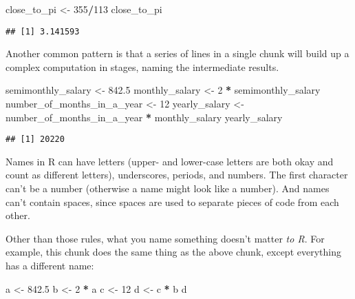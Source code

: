 \documentclass[
]{article}
\newenvironment{Shaded}{\begin{snugshade}}{\end{snugshade}}
\newcommand{\DecValTok}[1]{\textcolor[rgb]{0.00,0.00,0.81}{#1}}
\newcommand{\FloatTok}[1]{\textcolor[rgb]{0.00,0.00,0.81}{#1}}
\newcommand{\NormalTok}[1]{#1}
\newcommand{\OtherTok}[1]{\textcolor[rgb]{0.56,0.35,0.01}{#1}}
\newcommand{\SpecialCharTok}[1]{\textcolor[rgb]{0.81,0.36,0.00}{\textbf{#1}}}
\begin{document}
\begin{Shaded}
\begin{Highlighting}[]
\NormalTok{close\_to\_pi }\OtherTok{\textless{}{-}} \DecValTok{355}\SpecialCharTok{/}\DecValTok{113}
\NormalTok{close\_to\_pi}
\end{Highlighting}
\end{Shaded}

\begin{verbatim}
## [1] 3.141593
\end{verbatim}

Another common pattern is that a series of lines in a single chunk will
build up a complex computation in stages, naming the intermediate
results.

\begin{Shaded}
\begin{Highlighting}[]
\NormalTok{semimonthly\_salary }\OtherTok{\textless{}{-}} \FloatTok{842.5}
\NormalTok{monthly\_salary }\OtherTok{\textless{}{-}} \DecValTok{2} \SpecialCharTok{*}\NormalTok{ semimonthly\_salary}
\NormalTok{number\_of\_months\_in\_a\_year }\OtherTok{\textless{}{-}} \DecValTok{12}
\NormalTok{yearly\_salary }\OtherTok{\textless{}{-}}\NormalTok{ number\_of\_months\_in\_a\_year }\SpecialCharTok{*}\NormalTok{ monthly\_salary}
\NormalTok{yearly\_salary}
\end{Highlighting}
\end{Shaded}

\begin{verbatim}
## [1] 20220
\end{verbatim}

Names in R can have letters (upper- and lower-case letters are both okay
and count as different letters), underscores, periods, and numbers. The
first character can't be a number (otherwise a name might look like a
number). And names can't contain spaces, since spaces are used to
separate pieces of code from each other.

Other than those rules, what you name something doesn't matter \emph{to
R}. For example, this chunk does the same thing as the above chunk,
except everything has a different name:

\begin{Shaded}
\begin{Highlighting}[]
\NormalTok{a }\OtherTok{\textless{}{-}} \FloatTok{842.5}
\NormalTok{b }\OtherTok{\textless{}{-}} \DecValTok{2} \SpecialCharTok{*}\NormalTok{ a}
\NormalTok{c }\OtherTok{\textless{}{-}} \DecValTok{12}
\NormalTok{d }\OtherTok{\textless{}{-}}\NormalTok{ c }\SpecialCharTok{*}\NormalTok{ b}
\NormalTok{d}
\end{Highlighting}
\end{Shaded}
\end{document}

